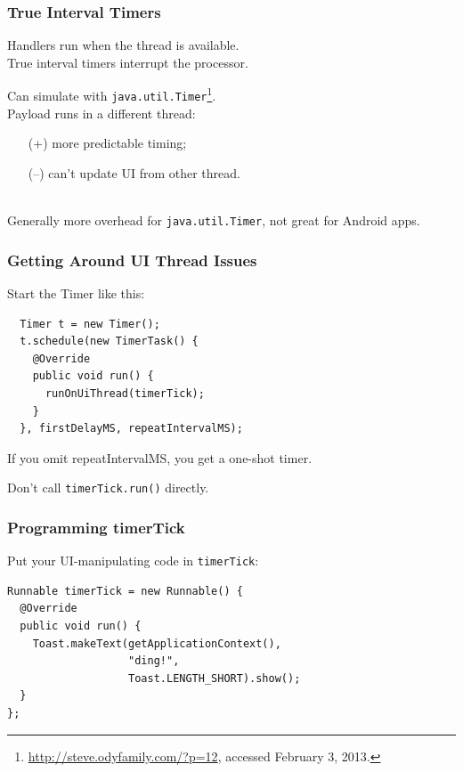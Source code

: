 \begin{frame}
\frametitle{True Interval Timers}

\large
\begin{changemargin}{1cm}
Handlers run when the thread is available.\\[1em]

True interval timers interrupt the processor.

Can simulate with {\tt java.util.Timer}\footnote{\url{http://steve.odyfamily.com/?p=12}, accessed
  February 3, 2013.}. \\[1em]

Payload runs in a different thread:
\begin{itemize}
\item[(+)] more predictable timing;
\item[(--)] can't update UI from other thread.
\end{itemize}
~\\
Generally more overhead for {\tt java.util.Timer}, not great for Android apps.
\end{changemargin}
\end{frame}

\begin{frame}[fragile]
\frametitle{Getting Around UI Thread Issues}

\begin{changemargin}{1cm}
Start the Timer like this:

\begin{lstlisting}
  Timer t = new Timer();
  t.schedule(new TimerTask() {
    @Override
    public void run() {
      runOnUiThread(timerTick);
    }
  }, firstDelayMS, repeatIntervalMS);
\end{lstlisting}
If you omit repeatIntervalMS, you get a one-shot timer.

Don't call {\tt timerTick.run()} directly.
\end{changemargin}

\end{frame}

\begin{frame}[fragile]
\frametitle{Programming timerTick}

\begin{changemargin}{1cm}
Put your UI-manipulating code in {\tt timerTick}:
\begin{lstlisting}
Runnable timerTick = new Runnable() {
  @Override
  public void run() {
    Toast.makeText(getApplicationContext(), 
                   "ding!", 
                   Toast.LENGTH_SHORT).show();
  }
};
\end{lstlisting}
\end{changemargin}

\end{frame}

